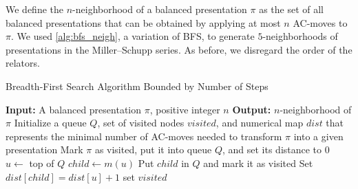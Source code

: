 We define the $n$-neighborhood of a balanced presentation $\pi$ as the set of all balanced presentations that can be obtained by applying at most $n$ AC-moves to $\pi$.
We used \autoref{alg:bfs_neigh}, a variation of BFS, to generate $5$-neighborhoods of presentations in the Miller--Schupp series. 
As before, we disregard the order of the relators.

\begin{algorithm}
	\caption{Breadth-First Search Algorithm Bounded by Number of Steps}\label{alg:bfs_neigh}
	\begin{algorithmic}[1]
		\State \textbf{Input:} A balanced presentation $\pi$, positive integer $n$
		\State \textbf{Output:} $n$-neighborhood of $\pi$
		\State Initialize a queue $Q$, set of visited nodes $visited$, and numerical map $dist$ that represents the minimal number of AC-moves needed to transform $\pi$ into a given presentation
		\State Mark $\pi$ as visited, put it into queue $Q$, and set its distance to $0$
		\State $u \gets $ top of $Q$ 
		\State $child \gets m(u)$
		\State Put $child$ in $Q$ and mark it as visited
		\State Set $dist[child] = dist[u] + 1$
		\EndIf
		\EndFor
		\EndWhile
		\Return set $visited$
	\end{algorithmic}
\end{algorithm}